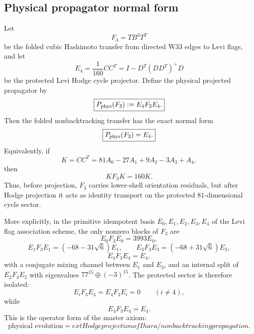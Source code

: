
\subsection{Physical propagator normal form}\label{subsec:physical-propagator-normal-form}

Let
\[
F_3=TB^3T^T
\]
be the folded cubic Hashimoto transfer from directed W33 edges to Levi flags, and let
\[
E_4=\frac1{160}CC^T
=I-D^T(DD^T)^+D
\]
be the protected Levi Hodge cycle projector.  Define the physical projected propagator by
\[
\boxed{
P_{\rm phys}(F_3):=E_4F_3E_4.
}
\]
Then the folded nonbacktracking transfer has the exact normal form
\[
\boxed{
P_{\rm phys}(F_3)=E_4.
}
\]
Equivalently, if
\[
K=CC^T=81A_0-27A_1+9A_2-3A_3+A_4,
\]
then
\[
\boxed{
KF_3K=160K.
}
\]
Thus, before projection, \(F_3\) carries lower-shell orientation residuals, but after Hodge projection it acts as identity transport on the protected \(81\)-dimensional cycle sector.

More explicitly, in the primitive idempotent basis \(E_0,E_1,E_2,E_3,E_4\) of the Levi flag association scheme, the only nonzero blocks of \(F_3\) are
\[
E_0F_3E_0=3993E_0,
\]
\[
E_1F_3E_1=(-68-31\sqrt6)E_1,
\qquad
E_3F_3E_3=(-68+31\sqrt6)E_3,
\]
\[
E_4F_3E_4=E_4,
\]
with a conjugate mixing channel between \(E_1\) and \(E_3\), and an internal split of \(E_2F_3E_2\) with eigenvalues \(77^{15}\oplus(-3)^{15}\).  The protected sector is therefore isolated:
\[
\boxed{
E_iF_3E_4=E_4F_3E_i=0\qquad (i\ne4),
}
\]
while
\[
\boxed{
E_4F_3E_4=E_4.
}
\]
This is the operator form of the master axiom:
\[
\boxed{
\text{physical evolution}=	ext{Hodge projection of Ihara/nonbacktracking propagation}.
}
\]
